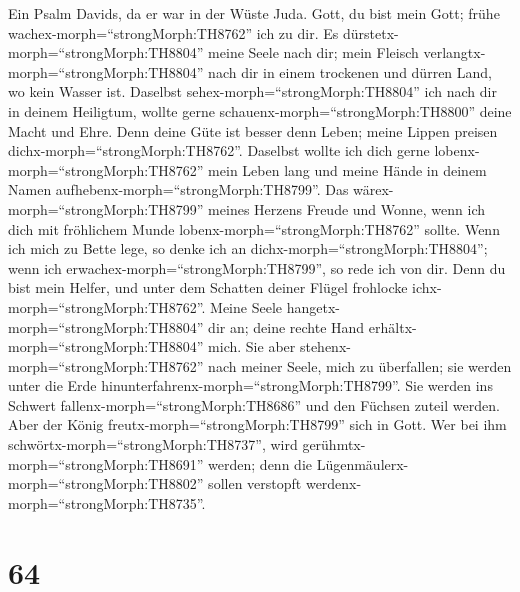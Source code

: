  Ein Psalm Davids, da er war in der Wüste Juda. Gott, du
bist mein Gott; frühe wachex-morph=``strongMorph:TH8762'' ich zu dir. Es
dürstetx-morph=``strongMorph:TH8804'' meine Seele nach dir; mein Fleisch
verlangtx-morph=``strongMorph:TH8804'' nach dir in einem trockenen und
dürren Land, wo kein Wasser ist.  Daselbst
sehex-morph=``strongMorph:TH8804'' ich nach dir in deinem Heiligtum,
wollte gerne schauenx-morph=``strongMorph:TH8800'' deine Macht und Ehre.
 Denn deine Güte ist besser denn Leben; meine Lippen preisen
dichx-morph=``strongMorph:TH8762''.  Daselbst wollte ich
dich gerne lobenx-morph=``strongMorph:TH8762'' mein Leben lang und meine
Hände in deinem Namen aufhebenx-morph=``strongMorph:TH8799''.
 Das wärex-morph=``strongMorph:TH8799'' meines Herzens
Freude und Wonne, wenn ich dich mit fröhlichem Munde
lobenx-morph=``strongMorph:TH8762'' sollte.  Wenn ich mich
zu Bette lege, so denke ich an dichx-morph=``strongMorph:TH8804''; wenn
ich erwachex-morph=``strongMorph:TH8799'', so rede ich von dir.
 Denn du bist mein Helfer, und unter dem Schatten deiner
Flügel frohlocke ichx-morph=``strongMorph:TH8762''.  Meine
Seele hangetx-morph=``strongMorph:TH8804'' dir an; deine rechte Hand
erhältx-morph=``strongMorph:TH8804'' mich.  Sie aber
stehenx-morph=``strongMorph:TH8762'' nach meiner Seele, mich zu
überfallen; sie werden unter die Erde
hinunterfahrenx-morph=``strongMorph:TH8799''.  Sie werden
ins Schwert fallenx-morph=``strongMorph:TH8686'' und den Füchsen zuteil
werden.  Aber der König freutx-morph=``strongMorph:TH8799''
sich in Gott. Wer bei ihm schwörtx-morph=``strongMorph:TH8737'', wird
gerühmtx-morph=``strongMorph:TH8691'' werden; denn die
Lügenmäulerx-morph=``strongMorph:TH8802'' sollen verstopft
werdenx-morph=``strongMorph:TH8735''.

\hypertarget{section-63}{%
\section{64}\label{section-63}}

